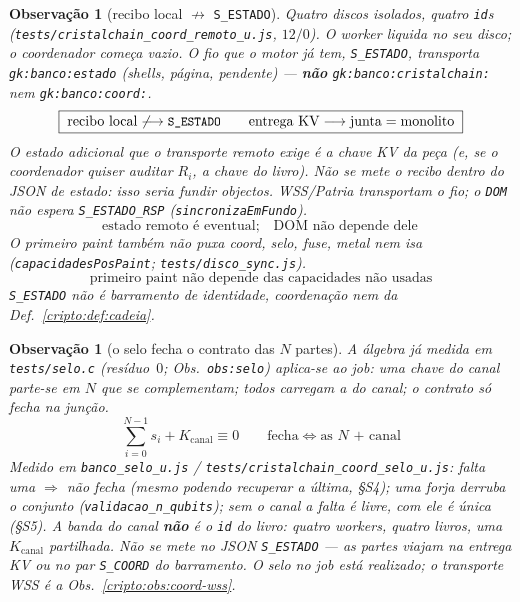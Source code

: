 \documentclass[11pt,a4paper]{article}
\newcommand{\code}[1]{\texttt{\small #1}}
\newtheorem{observacao}[teorema]{Observação}
\begin{document}
\begin{observacao}[recibo local $\not\to$ \code{S\_ESTADO}]\label{cripto:obs:coord-remoto}
Quatro discos isolados, quatro \code{id}s
(\code{tests/cristalchain\_coord\_remoto\_u.js}, $12/0$).
O worker liquida no \emph{seu} disco; o coordenador começa vazio.
O fio que o motor já tem, \code{S\_ESTADO}, transporta
\code{gk:banco:estado} (shells, página, pendente) ---
\textbf{não} \code{gk:banco:cristalchain:} nem
\code{gk:banco:coord:}.
\[
\boxed{\;
\text{recibo local}
\not\longrightarrow
\text{\code{S\_ESTADO}}
\qquad
\text{entrega KV}
\longrightarrow
\text{junta}=\text{monolito}
\;}
\]
O estado adicional que o transporte remoto exige é a chave KV
da peça (e, se o coordenador quiser auditar $R_i$, a chave do livro).
Não se mete o recibo dentro do JSON de estado: isso seria fundir
objectos. WSS/Patria transportam o fio; o \code{DOM} não espera
\code{S\_ESTADO\_RSP} (\code{sincronizaEmFundo}).
\[
\boxed{\;
\text{estado remoto é eventual};
\quad
\text{DOM não depende dele}
\;}
\]
O primeiro paint também não puxa coord, selo, fuse, metal nem isa
(\code{capacidadesPosPaint}; \code{tests/disco\_sync.js}).
\[
\boxed{\;
\text{primeiro paint não depende das capacidades não usadas}
\;}
\]
\code{S\_ESTADO} não é barramento de identidade, coordenação nem
da Def.~\ref{cripto:def:cadeia}.
\end{observacao}

\begin{observacao}[o selo fecha o contrato das $N$ partes]\label{cripto:obs:coord-nqubits}
A álgebra já medida em \code{tests/selo.c} (resíduo~$0$;
Obs.~\code{obs:selo}) aplica-se ao job:
uma chave do canal parte-se em $N$ que se complementam;
todos carregam a do canal; o contrato só fecha na junção.
\[
\boxed{\;
\sum_{i=0}^{N-1}s_i + K_{\mathrm{canal}}\equiv 0
\qquad
\text{fecha} \iff \text{as }N\text{ + canal}
\;}
\]
Medido em \code{banco\_selo\_u.js} /
\code{tests/cristalchain\_coord\_selo\_u.js}:
falta uma $\Rightarrow$ não fecha (mesmo podendo recuperar a última,
§S4); uma forja derruba o conjunto (\code{validacao\_n\_qubits});
sem o canal a falta é livre, com ele é única (§S5).
A banda do canal \textbf{não} é o \code{id} do livro:
quatro workers, quatro livros, uma $K_{\mathrm{canal}}$ partilhada.
Não se mete no JSON \code{S\_ESTADO} --- as partes viajam na entrega KV
ou no par \code{S\_COORD} do barramento.
O selo no job está realizado; o transporte WSS é a
Obs.~\ref{cripto:obs:coord-wss}.
\end{observacao}
\end{document}
